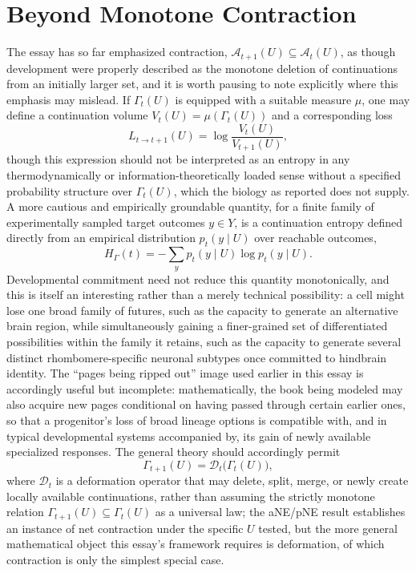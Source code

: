 \documentclass[11pt]{article}
\begin{document}
\section{Beyond Monotone Contraction}

The essay has so far emphasized contraction, $\mathcal{A}_{t+1}(U) \subseteq \mathcal{A}_t(U)$, as though development were properly described as the monotone deletion of continuations from an initially larger set, and it is worth pausing to note explicitly where this emphasis may mislead. If $\Gamma_t(U)$ is equipped with a suitable measure $\mu$, one may define a continuation volume $V_t(U) = \mu(\Gamma_t(U))$ and a corresponding loss
\begin{equation}
L_{t \to t+1}(U) = \log \frac{V_t(U)}{V_{t+1}(U)},
\end{equation}
though this expression should not be interpreted as an entropy in any thermodynamically or information-theoretically loaded sense without a specified probability structure over $\Gamma_t(U)$, which the biology as reported does not supply. A more cautious and empirically groundable quantity, for a finite family of experimentally sampled target outcomes $y \in Y$, is a continuation entropy defined directly from an empirical distribution $p_t(y \mid U)$ over reachable outcomes,
\begin{equation}
H_\Gamma(t) = -\sum_{y} p_t(y \mid U) \log p_t(y \mid U).
\end{equation}
Developmental commitment need not reduce this quantity monotonically, and this is itself an interesting rather than a merely technical possibility: a cell might lose one broad family of futures, such as the capacity to generate an alternative brain region, while simultaneously gaining a finer-grained set of differentiated possibilities within the family it retains, such as the capacity to generate several distinct rhombomere-specific neuronal subtypes once committed to hindbrain identity. The ``pages being ripped out'' image used earlier in this essay is accordingly useful but incomplete: mathematically, the book being modeled may also acquire new pages conditional on having passed through certain earlier ones, so that a progenitor's loss of broad lineage options is compatible with, and in typical developmental systems accompanied by, its gain of newly available specialized responses. The general theory should accordingly permit
\begin{equation}
\Gamma_{t+1}(U) = \mathcal{D}_t\bigl(\Gamma_t(U)\bigr),
\end{equation}
where $\mathcal{D}_t$ is a deformation operator that may delete, split, merge, or newly create locally available continuations, rather than assuming the strictly monotone relation $\Gamma_{t+1}(U) \subseteq \Gamma_t(U)$ as a universal law; the aNE/pNE result establishes an instance of net contraction under the specific $U$ tested, but the more general mathematical object this essay's framework requires is deformation, of which contraction is only the simplest special case.
\end{document}
